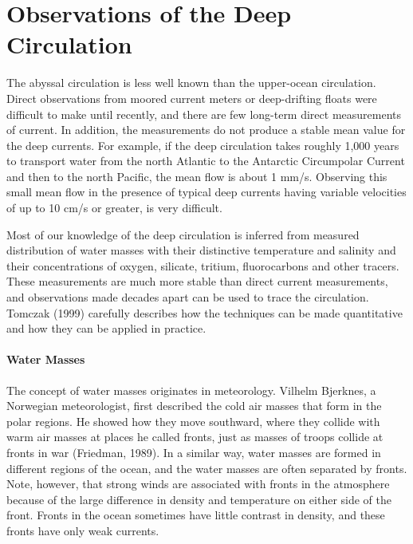 \section{Observations of the Deep Circulation}
The abyssal
circulation is less well known than the upper-ocean
circulation. Direct observations from moored current meters or
deep-drifting floats were difficult to make until recently, and there
are few long-term direct measurements of current. In addition, the
measurements do not produce a stable mean value for the deep
currents. For example, if the deep circulation takes roughly 1,000
years to transport
water from the north Atlantic to the Antarctic Circumpolar
Current and then to the north
Pacific, the mean flow is about 1 mm/s. Observing this small mean flow
in the presence of typical deep currents having variable velocities of
up to 10 cm/s or greater, is very difficult.

Most of our knowledge of the deep circulation is inferred from
measured distribution of water masses with their distinctive
temperature and salinity and their concentrations of oxygen, silicate,
tritium, fluorocarbons and other tracers. These measurements are much
more stable than direct current measurements, and observations made
decades apart can be used to trace the circulation. Tomczak (1999)
carefully describes how the techniques can be made quantitative and
how they can be applied in practice.

\paragraph{Water Masses}
The concept of water masses originates in meteorology. Vilhelm
Bjerknes, a Norwegian meteorologist, first described the cold air
masses that form in the polar regions. He showed how they move
southward, where they collide with warm air masses at places he called
fronts, just as masses of troops collide at fronts in war (Friedman,
1989). In a similar way, water masses are formed in different regions
of the ocean, and the water masses are often separated by
fronts. Note, however, that strong winds are associated with fronts in
the atmosphere because of the large difference in density and
temperature on either side of the front. Fronts in the ocean sometimes
have little contrast in density, and these fronts have only weak
currents.

